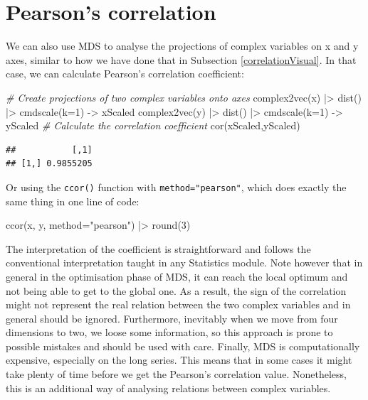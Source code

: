 \documentclass[
]{book}
\newenvironment{Shaded}{\begin{snugshade}}{\end{snugshade}}
\newcommand{\AttributeTok}[1]{\textcolor[rgb]{0.77,0.63,0.00}{#1}}
\newcommand{\CommentTok}[1]{\textcolor[rgb]{0.56,0.35,0.01}{\textit{#1}}}
\newcommand{\DecValTok}[1]{\textcolor[rgb]{0.00,0.00,0.81}{#1}}
\newcommand{\FunctionTok}[1]{\textcolor[rgb]{0.00,0.00,0.00}{#1}}
\newcommand{\NormalTok}[1]{#1}
\newcommand{\OtherTok}[1]{\textcolor[rgb]{0.56,0.35,0.01}{#1}}
\newcommand{\SpecialCharTok}[1]{\textcolor[rgb]{0.00,0.00,0.00}{#1}}
\newcommand{\StringTok}[1]{\textcolor[rgb]{0.31,0.60,0.02}{#1}}
\begin{document}
\hypertarget{correlationMDSPearson}{%
\section{Pearson's correlation}\label{correlationMDSPearson}}

We can also use MDS to analyse the projections of complex variables on x and y axes, similar to how we have done that in Subsection \ref{correlationVisual}. In that case, we can calculate Pearson's correlation coefficient:

\begin{Shaded}
\begin{Highlighting}[]
\CommentTok{\# Create projections of two complex variables onto axes}
\FunctionTok{complex2vec}\NormalTok{(x) }\SpecialCharTok{|\textgreater{}} \FunctionTok{dist}\NormalTok{() }\SpecialCharTok{|\textgreater{}} \FunctionTok{cmdscale}\NormalTok{(}\AttributeTok{k=}\DecValTok{1}\NormalTok{) }\OtherTok{{-}\textgreater{}}\NormalTok{ xScaled}
\FunctionTok{complex2vec}\NormalTok{(y) }\SpecialCharTok{|\textgreater{}} \FunctionTok{dist}\NormalTok{() }\SpecialCharTok{|\textgreater{}} \FunctionTok{cmdscale}\NormalTok{(}\AttributeTok{k=}\DecValTok{1}\NormalTok{) }\OtherTok{{-}\textgreater{}}\NormalTok{ yScaled}
\CommentTok{\# Calculate the correlation coefficient}
\FunctionTok{cor}\NormalTok{(xScaled,yScaled)}
\end{Highlighting}
\end{Shaded}

\begin{verbatim}
##           [,1]
## [1,] 0.9855205
\end{verbatim}

Or using the \texttt{ccor()} function with \texttt{method="pearson"}, which does exactly the same thing in one line of code:

\begin{Shaded}
\begin{Highlighting}[]
\FunctionTok{ccor}\NormalTok{(x, y, }\AttributeTok{method=}\StringTok{"pearson"}\NormalTok{) }\SpecialCharTok{|\textgreater{}} \FunctionTok{round}\NormalTok{(}\DecValTok{3}\NormalTok{)}
\end{Highlighting}
\end{Shaded}

The interpretation of the coefficient is straightforward and follows the conventional interpretation taught in any Statistics module. Note however that in general in the optimisation phase of MDS, it can reach the local optimum and not being able to get to the global one. As a result, the sign of the correlation might not represent the real relation between the two complex variables and in general should be ignored. Furthermore, inevitably when we move from four dimensions to two, we loose some information, so this approach is prone to possible mistakes and should be used with care. Finally, MDS is computationally expensive, especially on the long series. This means that in some cases it might take plenty of time before we get the Pearson's correlation value. Nonetheless, this is an additional way of analysing relations between complex variables.
\end{document}
